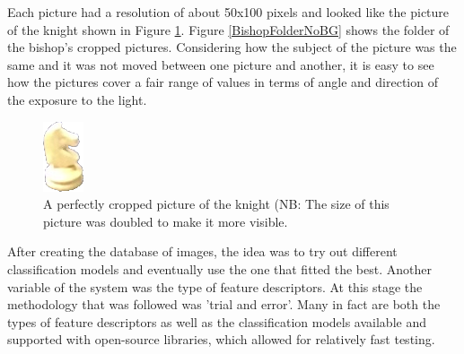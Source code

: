 \documentclass{l4proj}
\begin{document}
Each picture had a resolution of about 50x100 pixels and looked like the picture of the knight shown in Figure \ref{CroppedKnight}. Figure \ref{BishopFolderNoBG} shows the folder of the bishop's cropped pictures. Considering how the subject of the picture was the same and it was not moved between one picture and another, it is easy to see how the pictures cover a fair range of values in terms of angle and direction of the exposure to the light. 

\vspace{10mm}
\begin{figure}[h!]
\centering
\includegraphics[scale=1.5]{white_knight7.png}
\caption{A perfectly cropped picture of the knight (NB: The size of this picture was doubled to make it more visible.}
\label{CroppedKnight}
\end{figure}


\vspace{20mm}
After creating the database of images, the idea was to try out different classification models and eventually use the one that fitted the best. Another variable of the system was the type of feature descriptors. At this stage the methodology that was followed was 'trial and error'. Many in fact are both the types of feature descriptors as well as the classification models available and supported with open-source libraries, which allowed for relatively fast testing.
\end{document}
